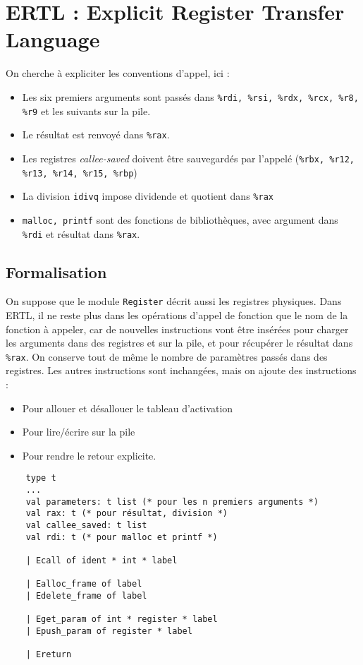 \documentclass{cours}
\begin{document}
\section{ERTL : Explicit Register Transfer Language}
On cherche à expliciter les conventions d'appel, ici : 
\begin{itemize}
    \item Les six premiers arguments sont passés dans \texttt{\%rdi, \%rsi, \%rdx, \%rcx, \%r8, \%r9} et les suivants sur la pile.
    \item Le résultat est renvoyé dans \texttt{\%rax}.
    \item Les registres \emph{callee-saved} doivent être sauvegardés par l'appelé (\texttt{\%rbx, \%r12, \%r13, \%r14, \%r15, \%rbp})
    \item La division \texttt{idivq} impose dividende et quotient dans \texttt{\%rax}
    \item \texttt{malloc, printf} sont des fonctions de bibliothèques, avec argument dans \texttt{\%rdi} et résultat dans \texttt{\%rax}.
\end{itemize}

\subsection{Formalisation}
On suppose que le module \texttt{Register} décrit aussi les registres physiques. Dans ERTL, il ne reste plus dans les opérations d'appel de fonction que le nom de la fonction à appeler, car de nouvelles instructions vont être insérées pour charger les arguments dans des registres et sur la pile, et pour récupérer le résultat dans \texttt{\%rax}. On conserve tout de même le nombre de paramètres passés dans des registres. Les autres instructions sont inchangées, mais on ajoute des instructions : 
\begin{itemize}
    \item Pour allouer et désallouer le tableau d'activation
    \item Pour lire/écrire sur la pile
    \item Pour rendre le retour explicite. 
\end{itemize}
\begin{verbatim}
    type t
    ...
    val parameters: t list (* pour les n premiers arguments *)
    val rax: t (* pour résultat, division *)
    val callee_saved: t list
    val rdi: t (* pour malloc et printf *)

    | Ecall of ident * int * label

    | Ealloc_frame of label
    | Edelete_frame of label

    | Eget_param of int * register * label
    | Epush_param of register * label

    | Ereturn
\end{verbatim}
\end{document}
